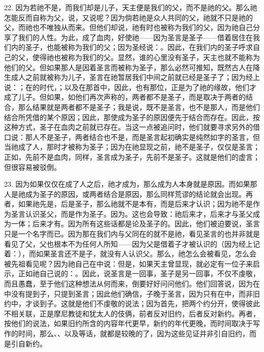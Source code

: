 22. 因为若祂不是，而我们却是儿子，天主便是我们的父，而不是祂的父。那么祂怎能反而自称为父，说，又说呢？因为倘若祂是众人共同的父，祂就不只是祂的父，而祂也不唯独从而来。但他们却说，祂有时也被称为我们的父，因为祂自己分享了我们的人性。为此，成了血肉，好使祂——因为圣言是圣子——借着居住在我们内的圣子，也能被称为我们的父；因为圣经说：。因此，在我们内的圣子呼求自己的父，使得祂也被称为我们的父。显然，谁的心里没有圣子，天主也就不能称为他们的父。但如果那人是因着圣言而被称为圣子，那么必然可推知，既然古人在降生成人之前就被称为儿子，圣言在祂暂居我们中间之前就已经是圣子了；因为经上说：；在的时代，；以及在那首中，因此，也有那位，正是为了祂的缘故，他们才成了儿子。但如果，如他们再次声称的，两者都不是圣子，而是取决于两者的结合，那么结果就是两者都不是圣子；我是说，既不是圣言，也不是那人，而是他们结合所凭借的某个原因；因此，那使成为圣子的原因便先于结合而存在。因此，按这种方式，圣子在血肉之前就已存在。当这一点被追问时，他们就要寻求另外的借口说：那人不是圣子，两者结合也不是，而是圣言起初确实是纯然如字的圣言，但当祂成了人，那时才被称为圣子；因为在祂显现之前，祂不是圣子，仅仅是圣言；正如，先前不是血肉，同样，圣言成为圣子，先前不是圣子。这就是他们的虚言；但很容易被驳倒。\par

23. 因为如果仅仅在成了人之后，祂才成为，那么成为人本身就是原因。而如果那人是祂成为圣子的原因，或两者结合是原因，那么同样荒谬的结论就会出现。再者，如果祂先是，后是圣子，那么祂就不是本有，而是后来才认识；因为祂不是作为圣言认识圣父，而是作为圣子。因为。这也会导致：祂后来才，后来才与圣父成为一体；后来才有。因为所有这些话都是论及圣子的。因此，他们被迫要说，圣言只是一个名字而已。因为那在我们内与父同在的就不是祂，看见圣言的也并非就是看见了父，父也根本不为任何人所知——因为父是借着子才被认识的（因为经上记着：），而如果圣言还不是子，就没有人认识父。那么，祂怎么会被看见，怎么会被先祖看见呢？因为祂自己在中说：但是，如果天主曾显现，就必定有一位子来启示，正如祂自己说的：。因此，说圣言是一回事，圣子是另一回事，不仅不虔敬，而且愚蠢，至于他们这种想法从何而来，倒要好好问问他们。他们回答说，因为在中没有提到子，只提到圣言；因此他们确信，子晚于圣言，因为只有在中，而非旧约中，才谈到子。这就是他们不虔敬的说法；因为首先，把两个约分开，使得彼此不相关联，正是摩尼教徒和犹太人的伎俩，前者反对旧约，后者反对新约。再者，按他们的说法，如果旧约所含的内容年代更早，新约的年代更晚，而时间取决于写作的时间，那么、、以及等话，就都是较晚的了，因为这些见证并非引自旧约，而是引自新约。\par

